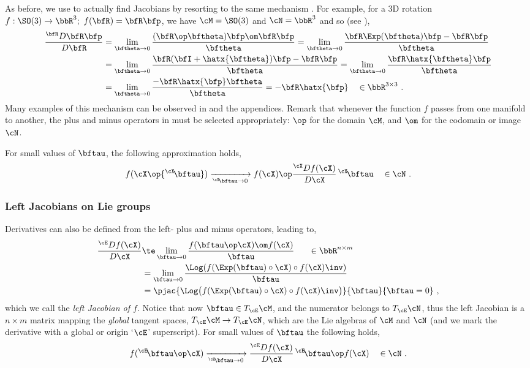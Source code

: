 As before, we use  to actually find Jacobians by resorting to the same mechanism . 
%
%
%
For example, for a 3D rotation $f:\SO(3)\to\bbR^3;~f(\bfR)=\bfR\bfp$, we have $\cM=\SO(3)$ and $\cN=\bbR^3$ and so (see ),
%
\begin{align*}
\rdpar{\bfR\bfp}{\bfR}
 &= \lim_{\bth\to0}\frac{(\bfR\op\bth)\bfp\om\bfR\bfp}{\bth} 
 = \lim_{\bth\to0}\frac{\bfR\Exp(\bth)\bfp-\bfR\bfp}{\bth} \\
 &= \lim_{\bth\to0}\frac{\bfR(\bfI+\hatx{\bth})\bfp-\bfR\bfp}{\bth} 
 = \lim_{\bth\to0}\frac{\bfR\hatx{\bth}\bfp}{\bth} \\
 &= \lim_{\bth\to0}\frac{-\bfR\hatx{\bfp}\bth}{\bth} 
 = -\bfR\hatx{\bfp} 
 ~~~\in \bbR^{3\times 3}
 ~.
\end{align*}
%
Many examples of this mechanism can be observed in  and the appendices.
%
Remark that whenever the function $f$ passes from one manifold to another, the plus and minus operators in  must be selected appropriately: 
$\op$ for the domain $\cM$, and $\om$ for the codomain or image $\cN$. 


For small values of $\bftau$, the following approximation holds,
%
\begin{align}\label{equ:lin_approx}
f(\cX\op{^\cX\!\bftau}) \xrightarrow[{^\cX\!\bftau}\to0]{} f(\cX)\op\rdpar{f(\cX)}{\cX}\,{^\cX\!\bftau}
\quad \in \cN
~.
\end{align}
%



\subsubsection{Left Jacobians on Lie groups}

Derivatives can also be defined from the left- plus and minus operators, leading to,
%
\begin{align}\label{equ:left-Jacobian}
\ldpar{f(\cX)}{\cX} 
& \te \lim_{\bftau\to0}\frac{f(\bftau\op\cX)\om f(\cX)}{\bftau}  
~~~~~\in\bbR^{n\times m}
\\
& = \lim_{\bftau\to0}\frac{\Log(f(\Exp(\bftau)\circ\cX) \circ f(\cX)\inv)}{\bftau} \notag
\\
&= \pjac{\Log\big(f(\Exp(\bftau)\circ\cX) \circ f(\cX)\inv\big)}{\bftau}{\bftau=0} \notag
~,
\end{align}
%
which we call the \emph{left Jacobian of $f$}.
Notice that now $\bftau\in\mtanat{\cM}{\cE}$, and the numerator belongs to $\mtanat{\cN}{\cE}$, thus the left Jacobian is a $n\times m$ matrix mapping the \emph{global} tangent spaces, $\mtanat{\cM}{\cE}\to\mtanat{\cN}{\cE}$, which are the Lie algebras of $\cM$ and $\cN$ (and we mark the derivative with a global or origin `$\cE$' superscript).
For small values of $\bftau$ the following holds,
%
\begin{align}\label{equ:lin_approx_left}
f({^\cE\!\bftau}\op\cX) \xrightarrow[{^\cE\!\bftau}\to0]{} \ldpar{f(\cX)}{\cX}\,{^\cE\!\bftau} \op f(\cX)
\quad \in \cN
~.
\end{align}

